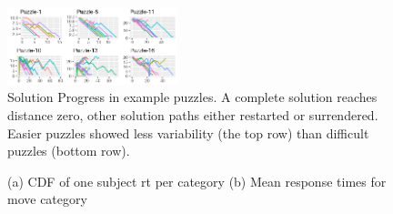 \documentclass[10pt,letterpaper]{article}
\begin{document}
\begin{figure}[!h]
\begin{center}
\includegraphics[width=0.44\textwidth]{p6_1}
\end{center}
\vspace{-0.6cm}
\caption{Solution Progress in example puzzles. A complete solution reaches distance zero, other solution paths either restarted or surrendered. Easier puzzles showed less variability (the top row) than difficult puzzles (bottom row).} 
\vspace{-0.2cm}
\label{fig:progress}
\end{figure}

\begin{figure}[h]
\vspace{-0.5cm}
	\centering
	\vspace{-0.1cm}
	\caption{(a) CDF of one subject rt per category (b) Mean response times for move category} 
	\label{fig:rt_cat}
\vspace{-0.5cm}
\end{figure}

\vspace{-0.2cm}
\end{document}
